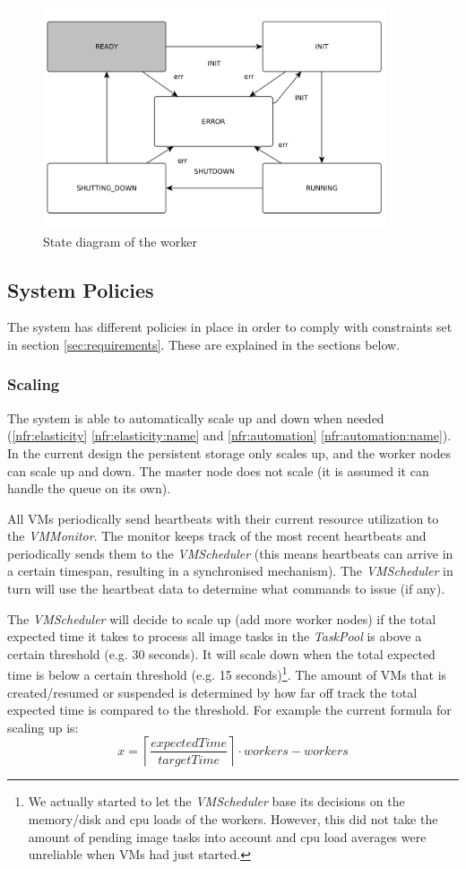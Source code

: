\documentclass[10pt,journal,compsoc]{IEEEtran}
\def\namedref#1{\ref{#1} \ref{#1:name}}
\begin{document}
\begin{figure}
\centering
\includegraphics[width=0.9\textwidth]{app_state_v2.pdf}
\caption{State diagram of the worker}
\label{fig:app_state}
\end{figure}


\subsection{System Policies}
\label{ssec:System Policies}
The system has different policies in place in order to comply with constraints set in
section \ref{sec:requirements}. These are explained in the sections below.

\subsubsection{Scaling}
The system is able to automatically scale up and down when needed
(\namedref{nfr:elasticity} and \namedref{nfr:automation}). In the current design
the persistent storage only scales up, and the worker nodes can scale up and
down. The master node does not scale (it is assumed it can handle the queue on
its own).

All VMs
periodically send
heartbeats with their current resource utilization to the 
\emph{VMMonitor}. The monitor keeps track of the most recent heartbeats and
periodically sends them to the \emph{VMScheduler} (this means heartbeats can
arrive in a certain timespan, resulting in a synchronised mechanism). The
\emph{VMScheduler} in turn will use the heartbeat data to determine what
commands to issue (if any).

The \emph{VMScheduler} will decide to scale up (add more worker nodes) if
the total expected time it takes to process all image tasks in the
\emph{TaskPool} is above a certain threshold (e.g. 30 seconds). It will
scale down when the total expected time is below a certain threshold (e.g. 15
seconds)\footnote{We actually started to let the \emph{VMScheduler} base its
decisions on the memory/disk and cpu loads of the workers. However, this did not
take the amount of pending image tasks into account and cpu load averages were
unreliable when VMs had just started.}. The amount of VMs that is created/resumed or suspended is determined
by how far off track the total expected time is compared to the threshold. For
example the
current formula for scaling up is: $$x =  \left\lceil \frac{expectedTime}{
targetTime}\right\rceil \cdot workers - workers$$
\end{document}
